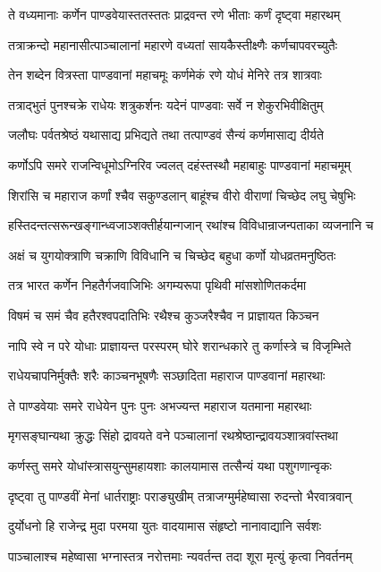\twolineshloka
{ते वध्यमानाः कर्णेन पाण्डवेयास्ततस्ततः}
{प्राद्रवन्त रणे भीताः कर्णं दृष्ट्वा महारथम्}


\twolineshloka
{तत्राक्रन्दो महानासीत्पाञ्चालानां महारणे}
{वध्यतां सायकैस्तीक्ष्णैः कर्णचापवरच्युतैः}


\twolineshloka
{तेन शब्देन वित्रस्ता पाण्डवानां महाचमूः}
{कर्णमेकं रणे योधं मेनिरे तत्र शात्रवाः}


\twolineshloka
{तत्राद्भुतं पुनश्चक्रे राधेयः शत्रुकर्शनः}
{यदेनं पाण्डवाः सर्वे न शेकुरभिवीक्षितुम्}


\twolineshloka
{जलौघः पर्वतश्रेष्ठं यथासाद्य प्रभिद्यते}
{तथा तत्पाण्डवं सैन्यं कर्णमासाद्य दीर्यते}


\twolineshloka
{कर्णोऽपि समरे राजन्विधूमोऽग्निरिव ज्वलत्}
{दहंस्तस्थौ महाबाहुः पाण्डवानां महाचमूम्}


\twolineshloka
{शिरांसि च महाराज कर्णां श्चैव सकुण्डलान्}
{बाहूंश्च वीरो वीराणां चिच्छेद लघु चेषुभिः}


\twolineshloka
{हस्तिदन्तत्सरून्खङ्गान्ध्वजाञ्शक्तीर्हयान्गजान्}
{रथांश्च विविधान्राजन्पताका व्यजनानि च}


\twolineshloka
{अक्षं च युगयोक्त्राणि चक्राणि विविधानि च}
{चिच्छेद बहुधा कर्णो योधव्रतमनुष्ठितः}


\twolineshloka
{तत्र भारत कर्णेन निहतैर्गजवाजिभिः}
{अगम्यरूपा पृथिवी मांसशोणितकर्दमा}


\twolineshloka
{विषमं च समं चैव हतैरश्वपदातिभिः}
{रथैश्च कुञ्जरैश्चैव न प्राज्ञायत किञ्चन}


\twolineshloka
{नापि स्वे न परे योधाः प्राज्ञायन्त परस्परम्}
{घोरे शरान्धकारे तु कर्णास्त्रे च विजृम्भिते}


\twolineshloka
{राधेयचापनिर्मुक्तैः शरैः काञ्चनभूषणैः}
{सञ्छादिता महाराज पाण्डवानां महारथाः}


\twolineshloka
{ते पाण्डवेयाः समरे राधेयेन पुनः पुनः}
{अभज्यन्त महाराज यतमाना महारथाः}


\twolineshloka
{मृगसङ्घान्यथा क्रुद्धः सिंहो द्रावयते वने}
{पञ्चालानां रथश्रेष्ठान्द्रावयञ्शात्रवांस्तथा}


\twolineshloka
{कर्णस्तु समरे योधांस्त्रासयुन्सुमहायशाः}
{कालयामास तत्सैन्यं यथा पशुगणान्वृकः}


\twolineshloka
{दृष्ट्वा तु पाण्डवीं मेनां धार्तराष्ट्राः पराङ्युखीम्}
{तत्राजग्मुर्महेष्वासा रुदन्तो भैरवात्रवान्}


\twolineshloka
{दुर्योधनो हि राजेन्द्र मुदा परमया युतः}
{वादयामास संहृष्टो नानावाद्यानि सर्वशः}


\twolineshloka
{पाञ्चालाश्च महेष्वासा भग्नास्तत्र नरोत्तमाः}
{न्यवर्तन्त तदा शूरा मृत्युं कृत्वा निवर्तनम्}


